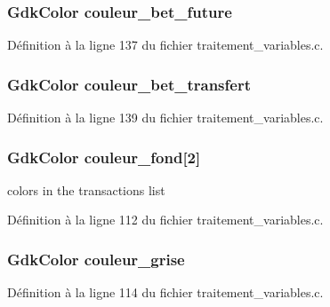 \subsubsection[{couleur\_\-bet\_\-future}]{\setlength{\rightskip}{0pt plus 5cm}GdkColor {\bf couleur\_\-bet\_\-future}}\label{affichage_8c_af7f95b1eb6717e97b624b506258fd893}


Définition à la ligne 137 du fichier traitement\_\-variables.c.

\subsubsection[{couleur\_\-bet\_\-transfert}]{\setlength{\rightskip}{0pt plus 5cm}GdkColor {\bf couleur\_\-bet\_\-transfert}}\label{affichage_8c_abf473d007a5860d19e62be3c33654a48}


Définition à la ligne 139 du fichier traitement\_\-variables.c.

\subsubsection[{couleur\_\-fond}]{\setlength{\rightskip}{0pt plus 5cm}GdkColor {\bf couleur\_\-fond}[2]}\label{affichage_8c_a58089bf9225ae2e274165369f8bc7a00}
colors in the transactions list 

Définition à la ligne 112 du fichier traitement\_\-variables.c.

\subsubsection[{couleur\_\-grise}]{\setlength{\rightskip}{0pt plus 5cm}GdkColor {\bf couleur\_\-grise}}\label{affichage_8c_a4119417896b5652f640ead3795baac52}


Définition à la ligne 114 du fichier traitement\_\-variables.c.

